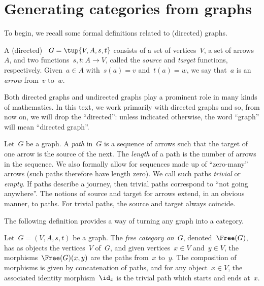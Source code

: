 

\section{Generating categories from graphs}
\label{sec:catsfromgraphs}
To begin, we recall some formal definitions related to (directed) graphs.


\begin{definition}[Graph]
  \label{def:graph}
  A (directed) \emph{}~$G=\tup{V,A,s,t}$ consists of a set of vertices~$V$, a set of arrows~$A$, and two functions~$s,t\colon A\to V$, called the \emph{source} and \emph{target} functions, respectively. Given~$a\in A$ with~$s(a)=v$ and~$t(a)=w$, we say that~$a$ is an \emph{arrow} from~$v$ to~$w$.
\end{definition}

\begin{remark}
  Both directed graphs and undirected graphs play a prominent role in many kinds of mathematics. In this text, we work primarily with directed graphs and so, from now on, we will drop the ``directed'': unless indicated otherwise, the word ``graph'' will mean ``directed graph''.
\end{remark}

\begin{definition}[Path]
  \label{def:path}
  Let~$G$ be a graph. A \emph{path} in~$G$ is a sequence of arrows such that the target of one arrow is the source of the next. The \emph{length} of a path is the number of arrows in the sequence. We also formally allow for sequences made up of ``zero-many'' arrows (such paths therefore have length zero). We call such paths \emph{trivial} or \emph{empty}. If paths describe a journey, then trivial paths correspond to ``not going anywhere''. The notions of source and target for arrows extend, in an obvious manner, to paths. For trivial paths, the source and target always coincide.
\end{definition}

The following definition provides a way of turning any graph into a category.

\begin{ctdefinition}
  \label{def:free-category}
  Let~$G=(V,A,s,t)$ be a graph. The \emph{free category on~$G$}, denoted~$\Free(G)$, has as objects the vertices~$V$ of~$G$, and given vertices~$x\in V$ and~$y\in V$, the morphisms~$\Free(G)(x,y)$ are the paths from~$x$ to~$y$.
  The composition of morphisms is given by concatenation of paths, and for any object~$x \in V$, the associated identity morphism~$\id_x$ is the trivial path which starts and ends at~$x$.
\end{ctdefinition}

